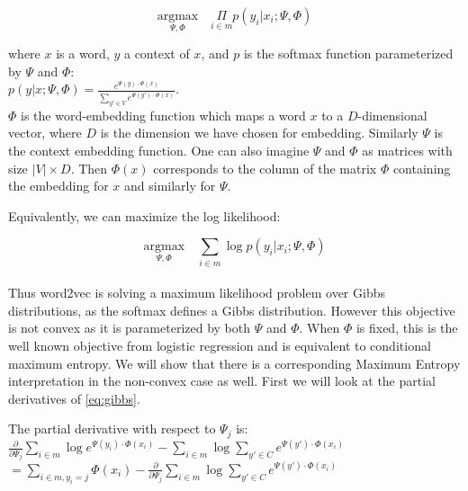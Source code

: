 \documentclass[]{article}
\begin{document}
\begin{equation} \underset{\Psi,\Phi}{\text{argmax}} \quad \underset{i \in m}{\Pi}{p(y_i|x_i; \Psi, \Phi)}\label{eq:gibbs}\end{equation} 

\noindent where $x$ is a word, $y$ a context of $x$, and $p$ is the softmax function parameterized by $\Psi$ and $\Phi$:\\

$p(y|x; \Psi,\Phi) = \frac{e^{\Psi(y) \cdot \Phi(x)}}{\sum_{y\prime \in V}e^{\Psi(y\prime) \cdot \Phi(x)}}$.\\

$\Phi$ is the word-embedding function which maps a word $x$ to a $D$-dimensional vector, where $D$ is the dimension we have chosen for embedding. Similarly $\Psi$ is the context embedding function. One can also imagine $\Psi$ and $\Phi$ as matrices with size $|V| \times D$. Then $\Phi(x)$ corresponds to the column of the matrix $\Phi$ containing the embedding for $x$ and similarly for $\Psi$.

Equivalently, we can maximize the log likelihood:

\begin{equation} \underset{\Psi,\Phi}{\text{argmax}} \quad \underset{i \in m}{\sum}{\log p(y_i|x_i; \Psi, \Phi)}\label{eq:gibbs}\end{equation}\\

Thus word2vec is solving a maximum likelihood problem over Gibbs distributions, as the softmax defines a Gibbs distribution. However this objective is not convex as it is parameterized by both $\Psi$ and $\Phi$. When  $\Phi$ is fixed, this is the well known objective from logistic regression and is equivalent to conditional maximum entropy. We will show that there is a corresponding Maximum Entropy interpretation in the non-convex case as well. First we will look at the partial derivatives of \autoref{eq:gibbs}.

The partial derivative with respect to $\Psi_j$ is:\\

$\frac{\partial}{\partial \Psi_j} \underset{i \in m}{\sum} \log e^{\Psi(y_i) \cdot \Phi(x_i)} - \underset{i \in m}{\sum} \log \sum_{y\prime \in C}e^{\Psi(y') \cdot \Phi(x_i)}$\\

$ = \underset{i \in m, y_i = j}{\sum} \Phi(x_i) - \frac{\partial}{\partial \Psi_j} \underset{i \in m}{\sum} \log \sum_{y\prime \in C}e^{\Psi(y') \cdot \Phi(x_i)}$\\
\end{document}

